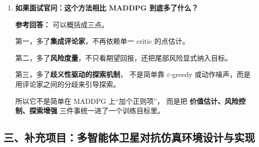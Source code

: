 \documentclass[11pt,a4paper]{ctexart}
\begin{document}
\begin{enumerate}[leftmargin=*, label=\textbf{Q\arabic*.}]
\item \textbf{如果面试官问：这个方法相比 MADDPG 到底多了什么？}

\textbf{参考回答：}
可以概括成三点。

第一，多了\textbf{集成评论家}，不再依赖单一 critic 的点估计。

第二，多了\textbf{风险度量}，不只看期望回报，还把尾部风险显式纳入目标。

第三，多了\textbf{歧义性驱动的探索机制}，
不是简单靠 $\varepsilon$-greedy 或动作噪声，而是用评论家之间的分歧来引导探索。

所以它不是简单在 MADDPG 上“加个正则项”，
而是把 \textbf{价值估计、风险控制、探索增强} 三件事统一进了一个训练目标里。

\end{enumerate}

\subsection*{三、补充项目：多智能体卫星对抗仿真环境设计与实现}
\end{document}

